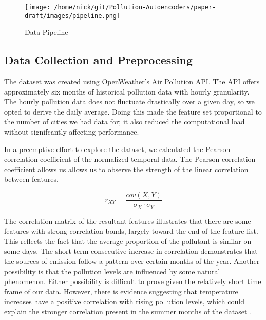 \documentclass{article}
\begin{document}
\newpage

\begin{Center}
\begin{figure}[h!]
\caption{Data Pipeline}
\label{fig:pipeline}
    \begin{center}
    \texttt{[image: /home/nick/git/Pollution-Autoencoders/paper-draft/images/pipeline.png]}
    \end{center}
\end{figure}
\end{Center}

\subsection{Data Collection and Preprocessing}

\par The dataset was created using OpenWeather's Air Pollution API. The API offers approximately six months of historical pollution data with hourly granularity. The hourly pollution data does not fluctuate drastically over a given day, so we opted to derive the daily average. Doing this made the feature set proportional to the number of cities we had data for; it also reduced the computational load without signifcantly affecting performance. 

\par In a preemptive effort to explore the dataset, we calculated the Pearson correlation coefficient of the normalized temporal data. The Pearson correlation coefficient allows us allows us to observe the strength of the linear correlation between features. 

\begin{equation*}
    r_{XY}=\frac{cov(X,Y)}{\sigma_{X} \cdot \sigma_{Y}}
\end{equation*}

\par The correlation matrix of the resultant features illustrates that there are some features with strong correlation bonds, largely toward the end of the feature list. This reflects the fact that the average proportion of the pollutant is similar on some days. The short term consecutive increase in correlation demonstrates that the sources of emission follow a pattern over certain months of the year. Another possibility is that the pollution levels are influenced by some natural phenomenon. Either possibility is difficult to prove given the relatively short time frame of our data. However, there is evidence suggesting that temperature increases have a positive correlation with rising pollution levels, which could explain the stronger correlation present in the summer months of the dataset \parencite{jayamurugan2013}.
\end{document}
